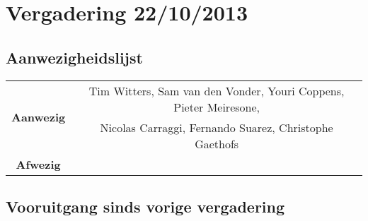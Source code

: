 \section{Vergadering 22/10/2013}
\subsection{Aanwezigheidslijst}
\begin{table}[htbp]
	\centering
	\begin{tabular}{c|c}
		\multirow{2}{*}{\textbf{Aanwezig}} & Tim Witters, Sam van den Vonder, Youri Coppens, Pieter Meiresone, \\
		& Nicolas Carraggi,  Fernando Suarez, Christophe Gaethofs \\
		\hline
		\textbf{Afwezig} &  \\
	\end{tabular}
\end{table}

\subsection{Vooruitgang sinds vorige vergadering}
